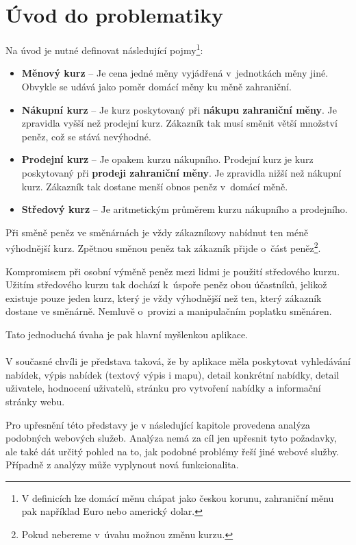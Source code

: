 \chapter{Úvod do problematiky}
\label{problematics}

Na úvod je nutné definovat následující pojmy\footnote{V definicích lze domácí měnu chápat jako českou korunu, zahraniční měnu pak například Euro nebo americký dolar.}:
\begin{itemize}
    \item \textbf{Měnový kurz} -- Je cena jedné měny vyjádřená v~jednotkách měny jiné. Obvykle se udává jako poměr domácí měny ku měně zahraniční.
    \item \textbf{Nákupní kurz} -- Je kurz poskytovaný při \textbf{nákupu zahraniční měny}. Je zpravidla vyšší než prodejní kurz. Zákazník tak musí směnit větší množství peněz, což se stává nevýhodné.
    \item \textbf{Prodejní kurz} -- Je opakem kurzu nákupního. Prodejní kurz je kurz poskytovaný při \textbf{prodeji zahraniční měny}. Je zpravidla nižší než nákupní kurz. Zákazník tak dostane menší obnos peněz v~domácí měně.
    \item \textbf{Středový kurz} -- Je aritmetickým průměrem kurzu nákupního a prodejního.
\end{itemize}

Při směně peněz ve směnárnách je vždy zákazníkovy nabídnut ten méně výhodnější kurz. Zpětnou směnou peněz tak zákazník přijde o~část peněz\footnote{Pokud nebereme v~úvahu možnou změnu kurzu.}.

Kompromisem při osobní výměně peněz mezi lidmi je použití středového kurzu. Užitím středového kurzu tak dochází k~úspoře peněz obou účastníků, jelikož existuje pouze jeden kurz, který je vždy výhodnější než ten, který zákazník dostane ve směnárně. Nemluvě o~provizi a manipulačním poplatku směnáren.

Tato jednoduchá úvaha je pak hlavní myšlenkou aplikace.
\\\\
V současné chvíli je představa taková, že by aplikace měla poskytovat vyhledávání nabídek, výpis nabídek (textový výpis i mapu), detail konkrétní nabídky, detail uživatele, hodnocení uživatelů, stránku pro vytvoření nabídky a informační stránky webu.

Pro upřesnění této představy je v následující kapitole provedena analýza podobných webových služeb. Analýza nemá za cíl jen upřesnit tyto požadavky, ale také dát určitý pohled na to, jak podobné problémy řeší jiné webové služby. Případně z analýzy může vyplynout nová funkcionalita.